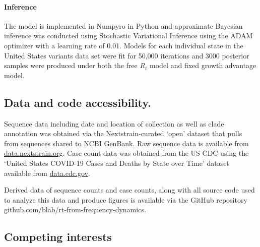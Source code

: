 \documentclass[11pt,oneside,letterpaper]{article}
\begin{document}



\paragraph{Inference}

The model is implemented in Numpyro \cite{phan2019composable} in Python and approximate Bayesian inference was conducted using Stochastic Variational Inference \cite{hoffman2013svi} using the ADAM optimizer \cite{kingma2017adam} with a learning rate of 0.01. 
Models for each individual state in the United States variants data set were fit for 50,000 iterations and 3000 posterior samples were produced under both the free $R_{t}$ model and fixed growth advantage model.

\subsection*{Data and code accessibility.}

Sequence data including date and location of collection as well as clade annotation was obtained via the Nextstrain-curated `open' dataset \cite{Hadfield2018} that pulls from sequences shared to NCBI GenBank.
Raw sequence data is available from \href{https://docs.nextstrain.org/projects/ncov/en/latest/reference/remote_inputs.html}{data.nextstrain.org}.
Case count data was obtained from the US CDC using the `United States COVID-19 Cases and Deaths by State over Time' dataset available from \href{https://data.cdc.gov/Case-Surveillance/United-States-COVID-19-Cases-and-Deaths-by-State-o/9mfq-cb36}{data.cdc.gov}.

Derived data of sequence counts and case counts, along with all source code used to analyze this data and produce figures is available via the GitHub repository \href{https://github.com/blab/rt-from-frequency-dynamics/}{github.com/blab/rt-from-frequency-dynamics}.

\subsection*{Competing interests}%
\end{document}
